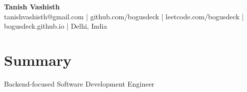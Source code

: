 \documentclass[10.8pt, a4paper]{article}
\begin{document}
\begin{center}
    {\Large \textbf{Tanish Vashisth}} \\
    tanishvashisth@gmail.com | github.com/bogusdeck | leetcode.com/bogusdeck | bogusdeck.github.io | Delhi, India
\end{center}
\section{Summary}
Backend-focused Software Development Engineer
\end{document}
